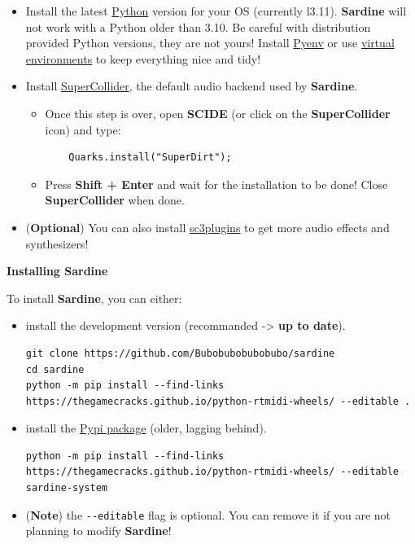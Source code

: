 \documentclass[11pt]{article}
\begin{document}
\begin{itemize}
\item Install the latest \href{https://www.python.org/}{Python} version for your OS (currently l3.11). \textbf{Sardine} will not work with a Python older than 3.10. Be careful with distribution provided Python versions, they are not yours! Install \href{https://github.com/pyenv/pyenv}{Pyenv} or use \href{https://docs.python.org/3/library/venv.html}{virtual environments} to keep everything nice and tidy!
\item Install \href{https://supercollider.github.io/}{SuperCollider}, the default audio backend used by \textbf{Sardine}.
\begin{itemize}
\item Once this step is over, open \textbf{SCIDE} (or click on the \textbf{SuperCollider} icon) and type:
\begin{verbatim}
    Quarks.install("SuperDirt");
\end{verbatim}
\item Press \textbf{Shift + Enter} and wait for the installation to be done! Close \textbf{SuperCollider} when done.
\end{itemize}
\item (\textbf{\textbf{Optional}}) You can also install \href{https://github.com/supercollider/sc3-plugins}{sc3plugins} to get more audio effects and synthesizers!
\end{itemize}

\textbf{Installing Sardine}

To install \textbf{Sardine}, you can either:
\begin{itemize}
\item install the development version (recommanded -> \textbf{up to date}).
\begin{verbatim}
git clone https://github.com/Bubobubobubobubo/sardine
cd sardine
python -m pip install --find-links https://thegamecracks.github.io/python-rtmidi-wheels/ --editable .
\end{verbatim}
\item install the \href{https://pypi.org/project/sardine-system/}{Pypi package} (older, lagging behind).
\begin{verbatim}
python -m pip install --find-links https://thegamecracks.github.io/python-rtmidi-wheels/ --editable sardine-system
\end{verbatim}
\item (\textbf{Note}) the \texttt{-{}-editable} flag is optional. You can remove it if you are not planning to modify \textbf{Sardine}!
\end{itemize}
\end{document}
